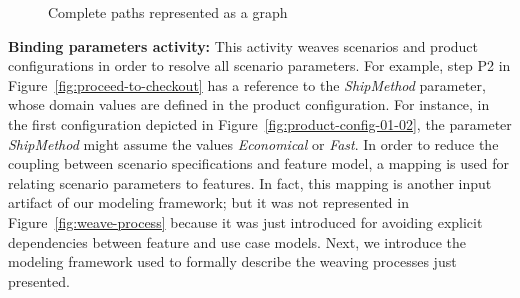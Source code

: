 \documentclass{report}
\begin{document}
\begin{frontmatter}
 
\begin{figure}[bth]
\begin{center}
\begin{tiny}
\begin{xy}
\end{xy}
\end{tiny}
\nocaptionrule \caption{Complete paths represented  as a graph}
\label{fig:complete-paths}
\end{center}
\end{figure}

{\bf Binding parameters activity:}  This activity weaves scenarios and product configurations in order to resolve all scenario parameters. 
For example, step P2 in Figure~\ref{fig:proceed-to-checkout} has a reference 
 to the \emph{ShipMethod} parameter, whose domain values are defined in the product configuration. For instance, in the first configuration depicted in Figure~\ref{fig:product-config-01-02}, the parameter \emph{ShipMethod} might assume the values \emph{Economical} or \emph{Fast}. 
In order to reduce the coupling between scenario specifications and feature model, a mapping is used for relating scenario parameters to features. In fact, this mapping is another input artifact of our modeling framework; but it was not represented in Figure~\ref{fig:weave-process} because it was just introduced for avoiding explicit dependencies between feature and use case models.  
Next, we introduce the modeling framework used to formally describe the weaving processes just presented. 


\end{frontmatter}
\end{document}
